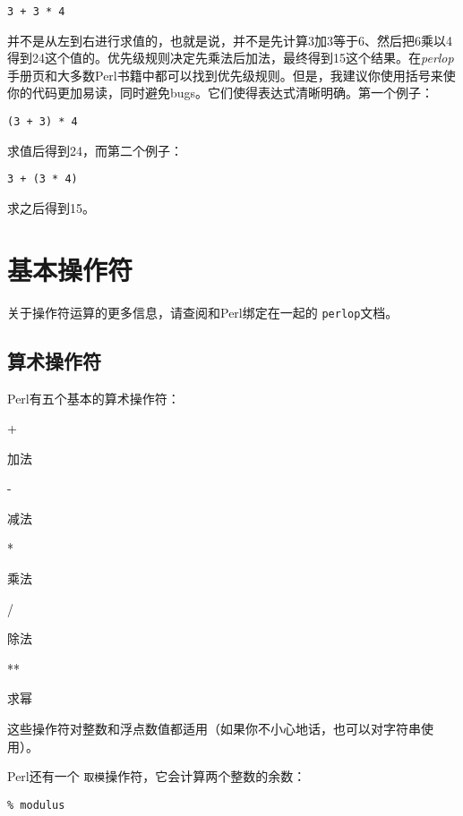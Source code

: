 \begin{lstlisting}
3 + 3 * 4
\end{lstlisting}

并不是从左到右进行求值的，也就是说，并不是先计算3加3等于6、然后把6乘以4得到24这个值的。优先级规则决定先乘法后加法，最终得到15这个结果。在\textit{perlop}手册页和大多数Perl书籍中都可以找到优先级规则。但是，我建议你使用括号来使你的代码更加易读，同时避免bugs。它们使得表达式清晰明确。第一个例子：

\begin{lstlisting}
(3 + 3) * 4
\end{lstlisting}

求值后得到24，而第二个例子：

\begin{lstlisting}
3 + (3 * 4)
\end{lstlisting}

求之后得到15。

\section{基本操作符}
关于操作符运算的更多信息，请查阅和Perl绑定在一起的 \verb|perlop|文档。

\subsection{算术操作符}
Perl有五个基本的算术操作符：

\noindent
\textcolor{black}{+}
\begin{adjustwidth}{4em}{}
加法
\end{adjustwidth}
\textcolor{black}{-}
\begin{adjustwidth}{4em}{}
减法
\end{adjustwidth}
\textcolor{black}{*}
\begin{adjustwidth}{4em}{}
乘法
\end{adjustwidth}
\textcolor{black}{/}
\begin{adjustwidth}{4em}{}
除法
\end{adjustwidth}
\textcolor{black}{**}
\begin{adjustwidth}{4em}{}
求幂
\end{adjustwidth}

这些操作符对整数和浮点数值都适用（如果你不小心地话，也可以对字符串使用）。

Perl还有一个 \verb|取模|操作符，它会计算两个整数的余数：

\begin{lstlisting}
% modulus
\end{lstlisting}

